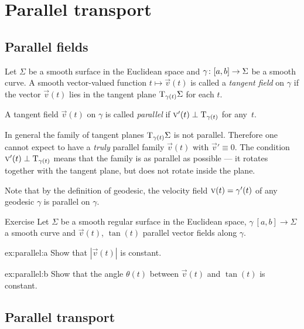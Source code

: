\chapter{Parallel transport}


\section{Parallel fields}

Let $\Sigma$ be a smooth surface in the Euclidean space and $\gamma\:[a,b]\z\to \Sigma$ be a smooth curve.
A smooth vector-valued function $t\mapsto {\vec v}(t)$ is called a \emph{tangent field} on $\gamma$ if
the vector ${\vec v}(t)$ lies in the tangent plane $\mathrm{T}_{\gamma(t)}\Sigma$ for each $t$.

A tangent field ${\vec v}(t)$ on $\gamma$ is called \emph{parallel} if ${\textsc v}'(t)\perp\mathrm{T}_{\gamma(t)}$ for any~$t$.

In general the family of tangent planes $\mathrm{T}_{\gamma(t)}\Sigma$ is not parallel.
Therefore one cannot expect to have a {}\emph{truly} parallel family ${\vec v}(t)$ with ${\vec v}'\equiv 0$.
The condition ${\textsc v}'(t)\perp\mathrm{T}_{\gamma(t)}$ means that the family is as parallel as possible --- it rotates together with the tangent plane, but does not rotate inside the plane.

Note that by the definition of geodesic, the velocity field ${\vec v}(t)\z=\gamma'(t)$ of any geodesic $\gamma$ is parallel on $\gamma$.

\begin{thm}{Exercise}\label{ex:parallel}
Let $\Sigma$ be a smooth regular surface in the Euclidean space, 
$\gamma\:[a,b]\to \Sigma$ a smooth curve 
and ${\vec v}(t)$, $\tan(t)$ parallel vector fields along $\gamma$.

\begin{subthm}{ex:parallel:a} Show that $|{\vec v}(t)|$ is constant.
\end{subthm}

\begin{subthm}{ex:parallel:b} Show that the angle $\theta(t)$ between ${\vec v}(t)$ and $\tan(t)$ is constant.
\end{subthm}

\end{thm}

\section{Parallel transport}

